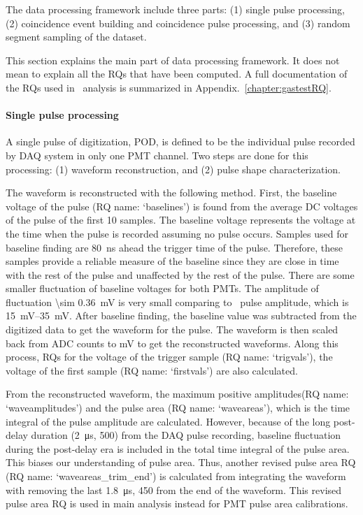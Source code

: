 The data processing framework include three parts: (1) single pulse processing, (2) coincidence event building and coincidence pulse processing, and (3) random segment sampling of the dataset.

This section explains the main part of data processing framework. It does not mean to explain all the RQs that have been computed. A full documentation of the RQs used in \gtest\ analysis is summarized in Appendix.~\ref{chapter:gastestRQ}.

\paragraph{Single pulse processing} A single pulse of digitization, POD, is defined to be the individual pulse recorded by DAQ system in only one PMT channel. Two steps are done for this processing: (1) waveform reconstruction, and (2) pulse shape characterization. 

The waveform is reconstructed with the following method. First, the baseline voltage of the pulse (RQ name: `baselines') is found from the average DC voltages of the pulse of the first 10 samples. The baseline voltage represents the voltage at the time when the pulse is recorded assuming no pulse occurs. Samples used for baseline finding are \SI{80}{\ns} ahead the trigger time of the pulse. Therefore, these samples provide a reliable measure of the baseline since they are close in time with the rest of the pulse and unaffected by the rest of the pulse. %
There are some smaller fluctuation of baseline voltages for both PMTs. The amplitude of fluctuation \SI{\sim 0.36}{\mV} is very small comparing to \sphe\ pulse amplitude, which is \SIrange{15}{35}{\mV}. After baseline finding, the baseline value was subtracted from the digitized data to get the waveform for the pulse. The waveform is then scaled back from ADC counts to \si{\mV} to get the reconstructed waveforms. Along this process, RQs for the voltage of the trigger sample (RQ name: `trigvals'), the voltage of the first sample (RQ name: `firstvals') are also calculated.

From the reconstructed waveform, the maximum positive amplitudes(RQ name: `waveamplitudes') and the pulse area (RQ name: `waveareas'), which is the time integral of the pulse amplitude are calculated. However, because of the long post-delay duration (\SI{2}{\us}, \SI{500}{\sample}) from the DAQ pulse recording, baseline fluctuation during the post-delay era is included in the total time integral of the pulse area. This biases our understanding of pulse area. Thus, another revised pulse area RQ (RQ name: `waveareas\_trim\_end') is calculated from integrating the waveform with removing the last \SI{1.8}{\us}, \SI{450}{\sample} from the end of the waveform. This revised pulse area RQ is used in main analysis instead for PMT pulse area calibrations. 

